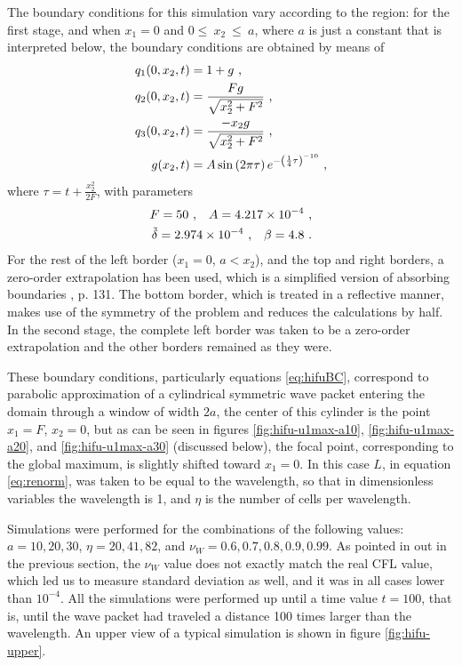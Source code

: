 The boundary conditions for this simulation vary according to the region:
for the first stage, and when $x_1=0$ and $0\leq~x_2~\leq~a$, where $a$ is just a constant that is interpreted below, the boundary conditions are obtained by means of
\begin{subequations}
  \label{eq:hifuBC}
  \begin{align}
    q_1(0,x_2,t) &= 1+g \ \text{,} \\
    q_2(0,x_2,t) &= \frac{F g}{\sqrt{x_2^2 + F^2}} \ \text{,} \\
    q_3(0,x_2,t) &= \frac{-x_2 g}{ \sqrt{x_2^2 + F^2} } \ \text{,} \\ 
    g(x_2,t) &= 
    A  \sin\left(2\pi\tau \right)
    e^{ -\left( \frac{1}{4}\tau\right)^{-10}} \ \text{,} 
  \end{align}
\end{subequations}
where $ \tau = t + \frac{x_2^2}{2F}$, with parameters
\begin{align*}
  F = 50
  \ \text{,} \quad
  A = 4.217\times 10^{-4} 
  \ \text{,} \\
  \tilde{\delta} = 2.974 \times 10^{-4}
  \ \text{,}  \quad
  \beta = 4.8
  \ \text{.} 
\end{align*}
For the rest of the left border ($x_1=0$, $a < x_2$), and the top and right borders, a zero-order extrapolation has been used, which is a simplified version of absorbing boundaries \citep{leveque-book-fv}, p. 131.
The bottom border, which is treated in a reflective manner, makes use of the symmetry of the problem and reduces the calculations by half. 
In the second stage, the complete left border was taken to be a zero-order extrapolation and the other borders remained as they were.

These boundary conditions, particularly equations \eqref{eq:hifuBC}, correspond to parabolic approximation of a cylindrical symmetric wave packet entering the domain through a window of width $2a$, the center of this cylinder is the point $x_1=F$, $x_2=0$, but as can be seen in figures \ref{fig:hifu-u1max-a10}, \ref{fig:hifu-u1max-a20}, and \ref{fig:hifu-u1max-a30} (discussed below),  the focal point, corresponding to the global maximum, is slightly shifted toward $x_1=0$. 
In this case $L$, in equation \eqref{eq:renorm}, was taken to be equal to the wavelength, so that in dimensionless variables the wavelength is 1, and $\eta$ is the number of cells per wavelength.

Simulations were performed for the combinations of the following values: $a=10,20,30$, $\eta=20,41,82$, and $\nu_W=0.6,0.7,0.8,0.9,0.99$.  
As pointed in out in the previous section, the $\nu_W$ value does not exactly match the real CFL value, which led us to measure standard deviation as well, and it was in all cases lower than $10^{-4}$. 
All the simulations were performed up until a time value $t=100$, that is, until the wave packet had traveled a distance 100 times larger than the wavelength.
An upper view of a typical simulation is shown in figure \ref{fig:hifu-upper}.

